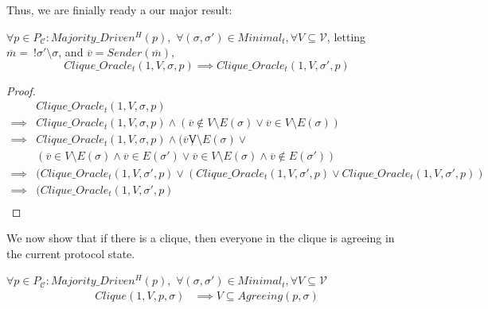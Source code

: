 Thus, we are finially ready a our major result:


\begin{lemma}
  $\forall p \in P_{\mathcal{C}} : Majority\_Driven^H(p),$ $\forall (\sigma, \sigma') \in Minimal_t, \forall V \subseteq \mathcal{V}$, letting $\overline{m} = ~ !\sigma'\setminus\sigma$, and $\overline{v} = Sender(\overline{m})$,
  $$
  Clique\_Oracle_t(1, V, \sigma, p) \implies Clique\_Oracle_t(1, V, \sigma', p)
  $$
\end{lemma}

\begin{proof}
\begin{align}
          &Clique\_Oracle_t(1, V, \sigma, p) \\
  \implies&Clique\_Oracle_t(1, V, \sigma, p) \land (\overline{v} \notin V \setminus E(\sigma) \lor \overline{v} \in V \setminus E(\sigma)) \\
  \implies&Clique\_Oracle_t(1, V, \sigma, p) \land (\overline{v} \not V \setminus E(\sigma) \lor \\
          &(\overline{v} \in V \setminus E(\sigma) \land \overline{v} \in E(\sigma') \lor \overline{v} \in V \setminus E(\sigma) \land \overline{v} \notin E(\sigma')) \\
  \implies&(Clique\_Oracle_t(1, V, \sigma', p) \lor (Clique\_Oracle_t(1, V, \sigma', p) \lor Clique\_Oracle_t(1, V, \sigma', p)) \\
  \implies&(Clique\_Oracle_t(1, V, \sigma', p) \\
\end{align}
\end{proof}

We now show that if there is a clique, then everyone in the clique is agreeing in the current protocol state.
\begin{lemma}
  $\forall p \in P_{\mathcal{C}} : Majority\_Driven^H(p),$ $\forall (\sigma, \sigma') \in Minimal_t, \forall V \subseteq \mathcal{V}$
\begin{align}
Clique(1, V, p, \sigma) &\implies V \subseteq Agreeing(p, \sigma)
\end{align}
\end{lemma}

